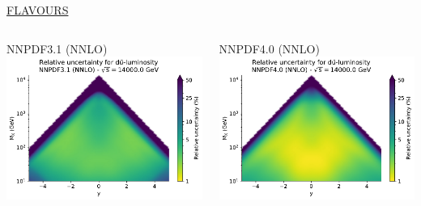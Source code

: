 \documentclass{beamer}
\begin{document}
\begin{frame}
\begin{overlayarea}{\textwidth}{5.2cm}
{\begin{columns}[c]
\begin{column}{0.5\textwidth}
   \end{column}
  \end{columns}  
  } 
  {
  \centering
  \underline{FLAVOURS}\\
  \begin{columns}[c]
   \begin{column}{0.5\textwidth}
    \centering
        NNPDF3.1 (NNLO)\\
        \vspace{0.1cm}
        \includegraphics[width=\columnwidth]{plots/plot_lumi2d_uncertainty_NNPDF31_dubar}\\
   \end{column}
   \begin{column}{0.5\textwidth}
    \centering
        NNPDF4.0 (NNLO)\\
        \vspace{0.1cm}
        \includegraphics[width=\columnwidth]{plots/plot_lumi2d_uncertainty_NNPDF40_dubar}\\    

\end{column}
\end{columns}}
\end{overlayarea}
\end{frame}
\end{document}
